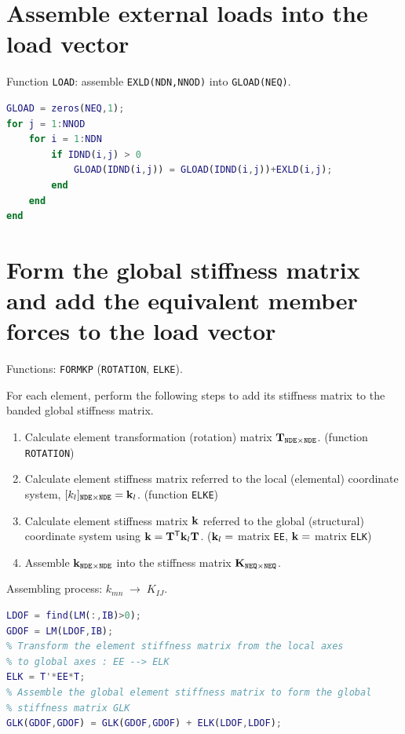 \section{Assemble external loads into the load vector}
Function \texttt{LOAD}: assemble \texttt{EXLD(NDN,NNOD)} into \texttt{GLOAD(NEQ)}.

\begin{lstlisting}[language=Matlab,numbers=none]
GLOAD = zeros(NEQ,1);
for j = 1:NNOD
    for i = 1:NDN
        if IDND(i,j) > 0
            GLOAD(IDND(i,j)) = GLOAD(IDND(i,j))+EXLD(i,j);
        end
    end
end
\end{lstlisting}

\section{Form the global stiffness matrix and add the equivalent member forces to the load vector}
Functions: \texttt{FORMKP} (\texttt{ROTATION}, \texttt{ELKE}).

For each element, perform the following steps to add its stiffness matrix to the banded global stiffness matrix.
\begin{enumerate}
  \item Calculate element transformation (rotation) matrix $\mathbf{T}_{\texttt{NDE}\times\texttt{NDE}}$. (function \texttt{ROTATION})
  \item Calculate element stiffness matrix referred to the local (elemental) coordinate system, $[k_l]_{\texttt{NDE}\times\texttt{NDE}} = \mathbf{k}_l$. (function \texttt{ELKE})
  \item Calculate element stiffness matrix $\mathbf{k}$ referred to the global (structural) coordinate system using $\mathbf{k} = \mathbf{T}^{\mathsf{T}}\mathbf{k}_l\mathbf{T}$. ($\mathbf{k}_l =$ matrix \texttt{EE}, $\mathbf{k} =$ matrix \texttt{ELK})
  \item Assemble $\mathbf{k}_{\texttt{NDE}\times\texttt{NDE}}$ into the stiffness matrix $\mathbf{K}_{\texttt{NEQ}\times\texttt{NEQ}}$.
\end{enumerate}
Assembling process: $k_{mn}\;\rightarrow\;K_{IJ}$.

\begin{lstlisting}[language=Matlab,numbers=none]
% Get element DOFs
LDOF = find(LM(:,IB)>0);
GDOF = LM(LDOF,IB);
% Transform the element stiffness matrix from the local axes
% to global axes : EE --> ELK
ELK = T'*EE*T;
% Assemble the global element stiffness matrix to form the global
% stiffness matrix GLK
GLK(GDOF,GDOF) = GLK(GDOF,GDOF) + ELK(LDOF,LDOF);
\end{lstlisting}

